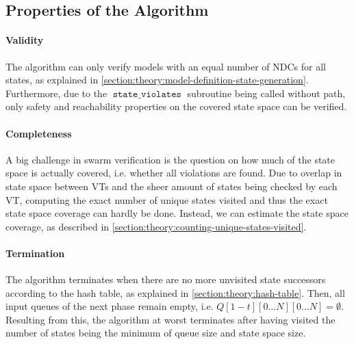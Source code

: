 \documentclass[
fancyheadings, %
%
%
]{stsreprt}
\DeclareMathOperator{\sViolates}{\texttt{state\_violates}}
\begin{document}

\subsection{Properties of the Algorithm}
\label{section:theory:grapple-properties}

\paragraph{Validity}
The algorithm can only verify models with an equal number of NDCs for all states, as explained in \cref{section:theory:model-definition-state-generation}.
Furthermore, due to the $\sViolates$ subroutine being called without path, only safety and reachability properties on the covered state space can be verified.


\paragraph{Completeness}
A big challenge in swarm verification is the question on how much of the state space is actually covered, i.e. whether all violations are found.
Due to overlap in state space between VTs and the sheer amount of states being checked by each VT, computing the exact number of unique states visited and thus the exact state space coverage can hardly be done.
Instead, we can estimate the state space coverage, as described in \cref{section:theory:counting-unique-states-visited}.

\paragraph{Termination}
The algorithm terminates when there are no more unvisited state successors according to the hash table, as explained in \cref{section:theory:hash-table}.
Then, all input queues of the next phase remain empty, i.e. $Q\left[1 - t\right]\left[0 \dots N\right]\left[0 \dots N\right] = \emptyset$.
Resulting from this, the algorithm at worst terminates after having visited the number of states being the minimum of queue size and state space size.
\end{document}
